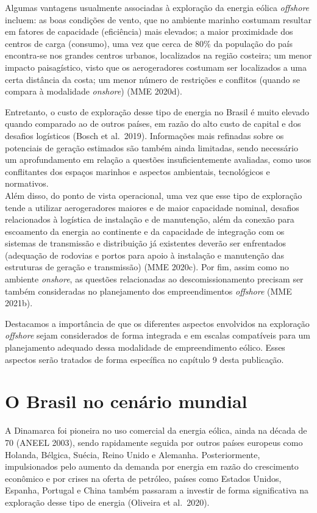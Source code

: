 \documentclass[
  oneside]{scrbook}
\begin{document}
Algumas vantagens usualmente associadas à exploração da energia eólica \emph{offshore} incluem: as boas condições de vento, que no ambiente marinho costumam resultar em fatores de capacidade (eficiência) mais elevados; a maior proximidade dos centros de carga (consumo), uma vez que cerca de 80\% da população do país encontra-se nos grandes centros urbanos, localizados na região costeira; um menor impacto paisagístico, visto que os aerogeradores costumam ser localizados a uma certa distância da costa; um menor número de restrições e conflitos (quando se compara à modalidade \emph{onshore}) (MME 2020d).

Entretanto, o custo de exploração desse tipo de energia no Brasil é muito elevado quando comparado ao de outros países, em razão do alto custo de capital e dos desafios logísticos (Bosch et al.~2019). Informações mais refinadas sobre os potenciais de geração estimados são também ainda limitadas, sendo necessário um aprofundamento em relação a questões insuficientemente avaliadas, como usos conflitantes dos espaços marinhos e aspectos ambientais, tecnológicos e normativos.\\
Além disso, do ponto de vista operacional, uma vez que esse tipo de exploração tende a utilizar aerogeradores maiores e de maior capacidade nominal, desafios relacionados à logística de instalação e de manutenção, além da conexão para escoamento da energia ao continente e da capacidade de integração com os sistemas de transmissão e distribuição já existentes deverão ser enfrentados (adequação de rodovias e portos para apoio à instalação e manutenção das estruturas de geração e transmissão) (MME 2020c). Por fim, assim como no ambiente \emph{onshore}, as questões relacionadas ao descomissionamento precisam ser também consideradas no planejamento dos empreendimentos \emph{offshore} (MME 2021b).

Destacamos a importância de que os diferentes aspectos envolvidos na exploração \emph{offshore} sejam considerados de forma integrada e em escalas compatíveis para um planejamento adequado dessa modalidade de empreendimento eólico. Esses aspectos serão tratados de forma específica no capítulo 9 desta publicação.

\hypertarget{o-brasil-no-cenuxe1rio-mundial}{%
\section{O Brasil no cenário mundial}\label{o-brasil-no-cenuxe1rio-mundial}}

A Dinamarca foi pioneira no uso comercial da energia eólica, ainda na década de 70 (ANEEL 2003), sendo rapidamente seguida por outros países europeus como Holanda, Bélgica, Suécia, Reino Unido e Alemanha. Posteriormente, impulsionados pelo aumento da demanda por energia em razão do crescimento econômico e por crises na oferta de petróleo, países como Estados Unidos, Espanha, Portugal e China também passaram a investir de forma significativa na exploração desse tipo de energia (Oliveira et al.~2020).
\end{document}
